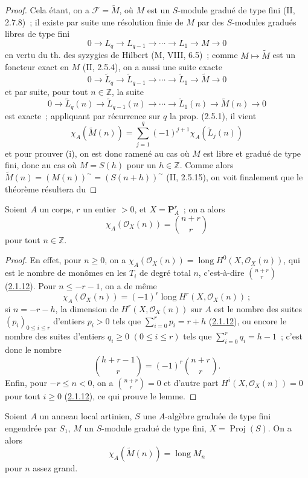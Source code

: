 \begin{proof}
Cela étant, on a $\mathcal F=\widetilde M$, où $M$ est un $S$-module
gradué de type fini (II, 2.7.8)~; il existe par suite une résolution finie
de $M$ par des $S$-modules gradués libres de type fini
\[
0\to L_q\to L_{q-1}\to\cdots\to L_1\to M\to0
\]
en vertu du th. des syzygies de Hilbert (M, VIII, 6.5)~; comme
$M\mapsto\widetilde M$ est un foncteur exact en $M$ (II, 2.5.4), on a
aussi une suite exacte
\[
0\to\widetilde L_q\to\widetilde L_{q-1}\to\cdots
\to\widetilde L_1\to\widetilde M\to0
\]
et par suite, pour tout $n\in\mathbb Z$, la suite
\[
0\to\widetilde L_q(n)\to\widetilde L_{q-1}(n)\to\cdots
\to\widetilde L_1(n)\to\widetilde M(n)\to0
\]
est exacte~; appliquant par récurrence sur $q$ la prop. (2.5.1), il vient
\[
\chi_A(\widetilde M(n))=\sum_{j=1}^{q}(-1)^{j+1}
\chi_A(\widetilde L_j(n))
\]
et pour prouver (i), on est donc ramené au cas où $M$ est libre et gradué
de type fini, donc au cas où $M=S(h)$ pour un $h\in\mathbb Z$. Comme
alors $\widetilde M(n)=(M(n))^\sim=(S(n+h))^\sim$ (II, 2.5.15), on voit
finalement que le théorème résultera du
\end{proof}

\begin{lemma}[2.5.3.1]
\label{III.2.5.3.1-fr}
Soient $A$ un corps, $r$ un entier $>0$, et $X=\mathbf P_A^r$~; on a
alors
\[
\chi_A(\mathcal O_X(n))=\binom{n+r}{r}
\]
pour tout $n\in\mathbb Z$.
\end{lemma}

\begin{proof}
En effet, pour $n\geq0$, on a
$\chi_A(\mathcal O_X(n))=\operatorname{long}H^0(X,\mathcal O_X(n))$, qui
est le nombre de monômes en les $T_i$ de degré total $n$, c'est-à-dire
$\binom{n+r}{r}$ (\hyperref[III.2.1.12-fr]{2.1.12}). Pour
$n\leq-r-1$, on a de même
\[
\chi_A(\mathcal O_X(n))=(-1)^r
\operatorname{long}H^r(X,\mathcal O_X(n))~;
\]
si $n=-r-h$, la dimension de $H^r(X,\mathcal O_X(n))$ sur $A$ est le
nombre des suites $(p_i)_{0\leq i\leq r}$ d'entiers $p_i>0$ tels que
$\sum_{i=0}^{r}p_i=r+h$ (\hyperref[III.2.1.12-fr]{2.1.12}), ou encore le
nombre des suites d'entiers $q_i\geq0$ $(0\leq i\leq r)$ tels que
$\sum_{i=0}^{r}q_i=h-1$~; c'est donc le nombre
\[
\binom{h+r-1}{r}=(-1)^r\binom{n+r}{r}.
\]
Enfin, pour $-r\leq n<0$, on a $\binom{n+r}{r}=0$ et d'autre part
$H^i(X,\mathcal O_X(n))=0$ pour tout $i\geq0$
(\hyperref[III.2.1.12-fr]{2.1.12}), ce qui prouve le lemme.
\end{proof}

\begin{corollary}[2.5.4]
\label{III.2.5.4-fr}
Soient $A$ un anneau local artinien, $S$ une $A$-algèbre graduée de type
fini engendrée par $S_1$, $M$ un $S$-module gradué de type fini,
$X=\operatorname{Proj}(S)$. On a alors
\[
\chi_A(\widetilde M(n))=\operatorname{long}M_n
\]
pour $n$ assez grand.
\end{corollary}

